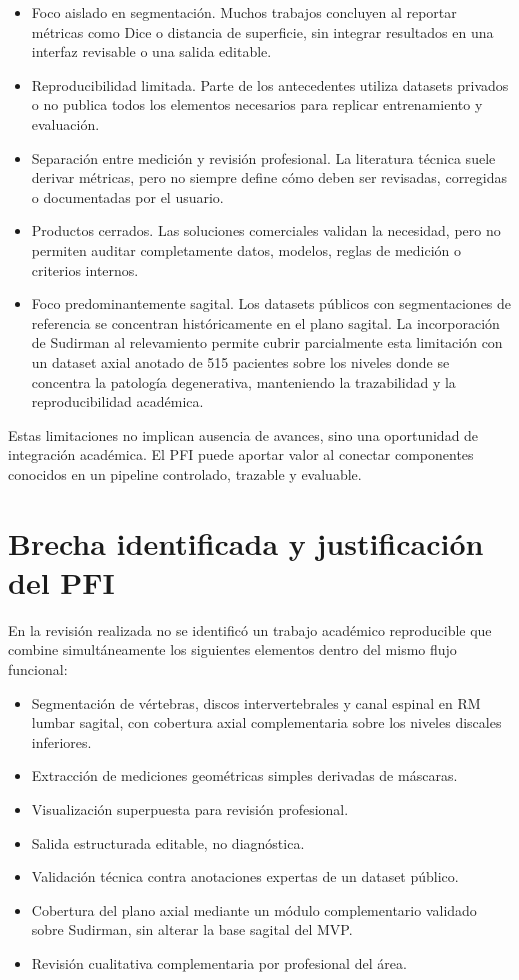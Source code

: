 \begin{itemize}
  \item Foco aislado en segmentación. Muchos trabajos concluyen al reportar métricas como Dice o distancia de superficie, sin integrar resultados en una interfaz revisable o una salida editable.
  \item Reproducibilidad limitada. Parte de los antecedentes utiliza datasets privados o no publica todos los elementos necesarios para replicar entrenamiento y evaluación.
  \item Separación entre medición y revisión profesional. La literatura técnica suele derivar métricas, pero no siempre define cómo deben ser revisadas, corregidas o documentadas por el usuario.
  \item Productos cerrados. Las soluciones comerciales validan la necesidad, pero no permiten auditar completamente datos, modelos, reglas de medición o criterios internos.
  \item Foco predominantemente sagital. Los datasets públicos con segmentaciones de referencia se concentran históricamente en el plano sagital. La incorporación de Sudirman al relevamiento permite cubrir parcialmente esta limitación con un dataset axial anotado de 515 pacientes sobre los niveles donde se concentra la patología degenerativa, manteniendo la trazabilidad y la reproducibilidad académica.
\end{itemize}

Estas limitaciones no implican ausencia de avances, sino una oportunidad de integración académica. El PFI puede aportar valor al conectar componentes conocidos en un pipeline controlado, trazable y evaluable.

\section{Brecha identificada y justificación del PFI}

En la revisión realizada no se identificó un trabajo académico reproducible que combine simultáneamente los siguientes elementos dentro del mismo flujo funcional:

\begin{itemize}
  \item Segmentación de vértebras, discos intervertebrales y canal espinal en RM lumbar sagital, con cobertura axial complementaria sobre los niveles discales inferiores.
  \item Extracción de mediciones geométricas simples derivadas de máscaras.
  \item Visualización superpuesta para revisión profesional.
  \item Salida estructurada editable, no diagnóstica.
  \item Validación técnica contra anotaciones expertas de un dataset público.
  \item Cobertura del plano axial mediante un módulo complementario validado sobre Sudirman, sin alterar la base sagital del MVP.
  \item Revisión cualitativa complementaria por profesional del área.
\end{itemize}

